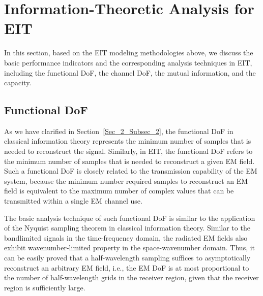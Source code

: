 \documentclass[journal,twocolumn]{IEEEtran}
\begin{document}
\section{Information-Theoretic Analysis for EIT}
In this section, based on the EIT modeling methodologies above, we discuss the basic performance indicators and the corresponding analysis techniques in EIT, including the functional DoF, the channel DoF, the mutual information, and the capacity. 


\subsection{Functional DoF}\label{Sec_4_Subsec_1}
As we have clarified in Section~\ref{Sec_2_Subsec_2}, the functional DoF in classical information theory represents the minimum number of samples that is needed to reconstruct the signal. Similarly, in EIT, the functional DoF refers to the minimum number of samples that is needed to reconstruct a given EM field. 
Such a functional DoF is closely related to the transmission capability of the EM system, because the minimum number required samples to reconstruct an EM field is equivalent to the maximum number of complex values that can be transmitted within a single EM channel use. 

The basic analysis technique of such functional DoF is similar to the application of the Nyquist sampling theorem in classical information theory. 
Similar to the bandlimited signals in the time-frequency domain, the radiated EM fields also exhibit wavenumber-limited property in the space-wavenumber domain. 
Thus, it can be easily proved that a half-wavelength sampling suffices to asymptotically reconstruct an arbitrary EM field, i.e., the EM DoF is at most proportional to the number of half-wavelength grids in the receiver region, given that the receiver region is sufficiently large. 
\end{document}
